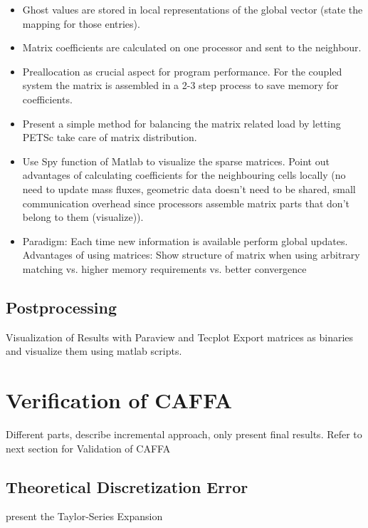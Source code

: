 \documentclass[article,type=msc,colorback,accentcolor=tud2a]{tudthesis}
\begin{document}
      \begin{itemize}
        \item Ghost values are stored in local representations of the global vector (state the mapping for those entries). 
        \item Matrix coefficients are calculated on one processor and sent to the neighbour. 
        \item Preallocation as crucial aspect for program performance. For the coupled system the matrix is assembled in a 2-3 step process to save memory for coefficients. 
        \item Present a simple method for balancing the matrix related load by letting PETSc take care of matrix distribution. 
        \item Use Spy function of Matlab to visualize the sparse matrices. Point out advantages of calculating coefficients for the neighbouring cells locally (no need to update mass fluxes, geometric data doesn't need to be shared, small communication overhead since processors assemble matrix parts that don't belong to them (visualize)). 
        \item Paradigm: Each time new information is available perform global updates. Advantages of using matrices: Show structure of matrix when using arbitrary matching vs. higher memory requirements vs. better convergence
      \end{itemize}

    \subsection{Postprocessing}
    
      Visualization of Results with Paraview and Tecplot
      Export matrices as binaries and visualize them using matlab scripts.

  \section{Verification of CAFFA}
    
    Different parts, describe incremental approach, only present final results.
    Refer to next section for Validation of CAFFA

    \subsection{Theoretical Discretization Error}
      present the Taylor-Series Expansion
\end{document}
